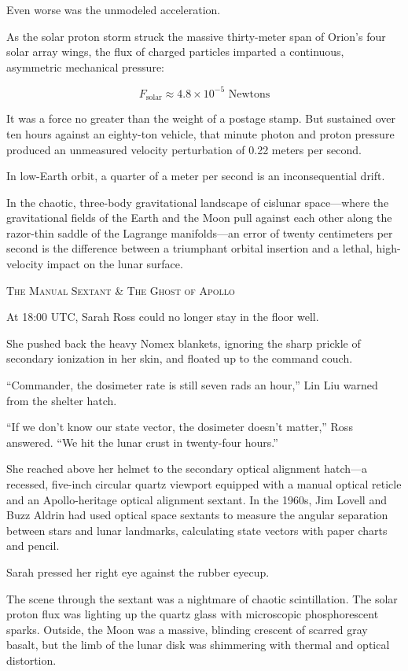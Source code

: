 \documentclass[12pt,twoside,openright]{book}
\newcommand{\sceneheader}[1]{%
  \par\vspace{1.8em}%
  {\noindent\centering\scshape\large #1\par}%
  \vspace{1.0em}%
  \noindent%
}
\newcommand{\dinkus}{%
  \par\vspace{1.2em}%
  {\noindent\centering{\large $\ast\quad\ast\quad\ast$}\par}%
  \vspace{1.2em}%
  \noindent%
}
\begin{document}
Even worse was the unmodeled acceleration.

As the solar proton storm struck the massive thirty-meter span of
Orion's four solar array wings, the flux of charged particles imparted a
continuous, asymmetric mechanical pressure:

\[F_{\text{solar}} \approx 4.8 \times 10^{-5} \text{ Newtons}\]

It was a force no greater than the weight of a postage stamp. But
sustained over ten hours against an eighty-ton vehicle, that minute
photon and proton pressure produced an unmeasured velocity perturbation
of 0.22 meters per second.

In low-Earth orbit, a quarter of a meter per second is an
inconsequential drift.

In the chaotic, three-body gravitational landscape of cislunar
space---where the gravitational fields of the Earth and the Moon pull
against each other along the razor-thin saddle of the Lagrange
manifolds---an error of twenty centimeters per second is the difference
between a triumphant orbital insertion and a lethal, high-velocity
impact on the lunar surface.

\dinkus

\sceneheader{The Manual Sextant \& The Ghost of
Apollo}

At 18:00 UTC, Sarah Ross could no longer stay in the floor well.

She pushed back the heavy Nomex blankets, ignoring the sharp prickle of
secondary ionization in her skin, and floated up to the command couch.

``Commander, the dosimeter rate is still seven rads an hour,'' Lin Liu
warned from the shelter hatch.

``If we don't know our state vector, the dosimeter doesn't matter,''
Ross answered. ``We hit the lunar crust in twenty-four hours.''

She reached above her helmet to the secondary optical alignment
hatch---a recessed, five-inch circular quartz viewport equipped with a
manual optical reticle and an Apollo-heritage optical alignment sextant.
In the 1960s, Jim Lovell and Buzz Aldrin had used optical space sextants
to measure the angular separation between stars and lunar landmarks,
calculating state vectors with paper charts and pencil.

Sarah pressed her right eye against the rubber eyecup.

The scene through the sextant was a nightmare of chaotic scintillation.
The solar proton flux was lighting up the quartz glass with microscopic
phosphorescent sparks. Outside, the Moon was a massive, blinding
crescent of scarred gray basalt, but the limb of the lunar disk was
shimmering with thermal and optical distortion.
\end{document}
